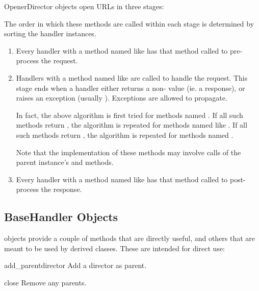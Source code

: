 OpenerDirector objects open URLs in three stages:

The order in which these methods are called within each stage is
determined by sorting the handler instances.

\begin{enumerate}
  \item Every handler with a method named like
     has that method called to
    pre-process the request.

  \item Handlers with a method named like
     are called to handle the request.
    This stage ends when a handler either returns a
    non- value (ie. a response), or raises an exception
    (usually ).  Exceptions are allowed to propagate.

    In fact, the above algorithm is first tried for methods named
    .  If all such methods return
    , the algorithm is repeated for methods named like
    .  If all such methods return
    , the algorithm is repeated for methods named
    .

    Note that the implementation of these methods may involve calls of
    the parent  instance's  and
     methods.

  \item Every handler with a method named like
     has that method called to
    post-process the response.

\end{enumerate}

\subsection{BaseHandler Objects \label{base-handler-objects}}

 objects provide a couple of methods that are
directly useful, and others that are meant to be used by derived
classes.  These are intended for direct use:

\begin{methoddesc}[BaseHandler]{add_parent}{director}
Add a director as parent.
\end{methoddesc}

\begin{methoddesc}[BaseHandler]{close}{}
Remove any parents.
\end{methoddesc}

